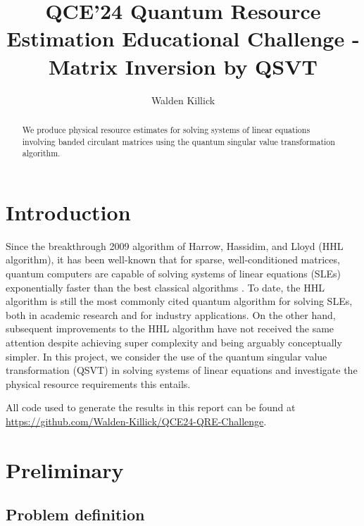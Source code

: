 \documentclass[10pt, twocolumn]{article}
\begin{document}
\title{QCE'24 Quantum Resource Estimation Educational Challenge - Matrix Inversion by QSVT}
\author{Walden Killick}

\maketitle

\begin{abstract}
	We produce physical resource estimates for solving systems of linear equations involving banded circulant matrices using the quantum singular value transformation algorithm.
\end{abstract}

\section{Introduction}

Since the breakthrough 2009 algorithm of Harrow, Hassidim, and Lloyd (HHL algorithm), it has been well-known that for sparse, well-conditioned matrices, quantum computers are capable of solving systems of linear equations (SLEs) exponentially faster than the best classical algorithms \cite{harrow2009quantum}. To date, the HHL algorithm is still the most commonly cited quantum algorithm for solving SLEs, both in academic research and for industry applications. On the other hand, subsequent improvements to the HHL algorithm have not received the same attention despite achieving super complexity and being arguably conceptually simpler. In this project, we consider the use of the quantum singular value transformation (QSVT) \cite{gilyen2019quantum, martyn2021grand} in solving systems of linear equations and investigate the physical resource requirements this entails.

All code used to generate the results in this report can  be found at \href{https://github.com/Walden-Killick/QCE24-QRE-Challenge}{https://github.com/Walden-Killick/QCE24-QRE-Challenge}.

\section{Preliminary}

\subsection{Problem definition}
\end{document}
